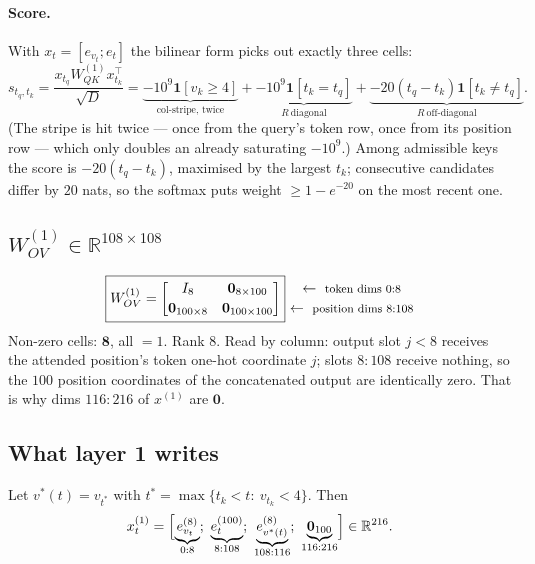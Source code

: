 \documentclass[11pt]{article}
\newcommand{\R}{\mathbb{R}}
\newcommand{\Wqk}{W_{QK}}
\newcommand{\Wov}{W_{OV}}
\newcommand{\sd}{\sqrt{D}}
\newcommand{\rowlab}[1]{\ \leftarrow\ \text{\footnotesize #1}}
\begin{document}
\paragraph{Score.} With $x_{t}=[e_{v_t};e_{t}]$ the bilinear form picks out exactly three cells:
\begin{equation}
s_{t_q,t_k}=\frac{x_{t_q}\Wqk^{(1)}x_{t_k}^\top}{\sd}
=\underbrace{-10^{9}\bm{1}[v_k\ge4]}_{\text{col-stripe, twice}}
+\underbrace{-10^{9}\bm{1}[t_k=t_q]}_{R\ \text{diagonal}}
+\underbrace{-20(t_q-t_k)\bm{1}[t_k\neq t_q]}_{R\ \text{off-diagonal}} .
\end{equation}
(The stripe is hit twice --- once from the query's token row, once from its position row --- which
only doubles an already saturating $-10^9$.) Among admissible keys the score is $-20(t_q-t_k)$,
maximised by the largest $t_k$; consecutive candidates differ by $20$ nats, so the softmax puts
weight $\ge 1-e^{-20}$ on the most recent one.

\subsection{$\Wov^{(1)}\in\R^{108\times108}$}
\begin{equation}
\boxed{\Wov^{(1)}=
\begin{bmatrix}
I_{8} & \bm{0}_{8\times100}\\[2pt]
\bm{0}_{100\times8} & \bm{0}_{100\times100}
\end{bmatrix}}
\begin{matrix}
\rowlab{token dims $0{:}8$}\\[2pt]
\rowlab{position dims $8{:}108$}
\end{matrix}
\end{equation}
Non-zero cells: $\bm{8}$, all $=1$. Rank $8$.
Read by column: output slot $j<8$ receives the attended position's token one-hot coordinate $j$;
slots $8{:}108$ receive nothing, so the $100$ position coordinates of the concatenated output are
identically zero. That is why dims $116{:}216$ of $x^{(1)}$ are $\bm{0}$.

\subsection{What layer 1 writes}
Let $v^*(t)=v_{t^*}$ with $t^*=\max\{t_k<t:\ v_{t_k}<4\}$. Then
\begin{equation}
x^{(1)}_t=\Bigl[\underbrace{e^{(8)}_{v_t}}_{0:8};\ \underbrace{e^{(100)}_t}_{8:108};\
\underbrace{e^{(8)}_{v^*(t)}}_{108:116};\ \underbrace{\bm{0}_{100}}_{116:216}\Bigr]\in\R^{216}.
\end{equation}
\end{document}
